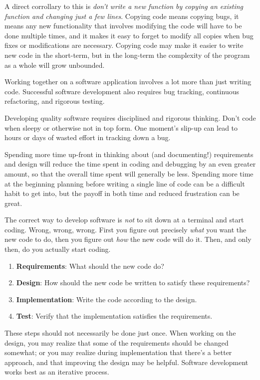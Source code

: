 \documentclass{book}
\begin{document}
A direct corrollary to this is \textit{don't write a new function by
copying an existing function and changing just a few lines}.  Copying
code means copying bugs, it means any new functionality that involves
modifying the code will have to be done multiple times, and it makes
it easy to forget to modify all copies when bug fixes or modifications
are necessary.  Copying code may make it easier to write new code in
the short-term, but in the long-term the complexity of the program as
a whole will grow unbounded.

Working together on a software application involves a lot more than
just writing code.  Successful software development also requires bug
tracking, continuous refactoring, and rigorous testing.

Developing quality software requires disciplined and rigorous
thinking.  Don't code when sleepy or otherwise not in top form.  One
moment's slip-up can lead to hours or days of wasted effort in
tracking down a bug.  

Spending more time up-front in thinking about (and documenting!) 
requirements and design will reduce the time spent in coding and
debugging by an even greater amount, so that the overall time spent
will generally be less.  Spending more time at the beginning planning
before writing a single line of code can be a difficult habit to get
into, but the payoff in both time and reduced frustration can be
great.

The correct way to develop software is \textit{not} to sit down at a
terminal and start coding.  Wrong, wrong, wrong.  First you figure out
precisely \textit{what} you want the new code to do, then you figure
out \textit{how} the new code will do it.  Then, and only then, do you
actually start coding.

\begin{enumerate}
\item \textbf{Requirements}: What should the new code do?
\item \textbf{Design}: How should the new code be written to satisfy these requirements?
\item \textbf{Implementation}: Write the code according to the design.
\item \textbf{Test}: Verify that the implementation satisfies the requirements.
\end{enumerate}

These steps should not necessarily be done just once.  When working on
the design, you may realize that some of the requirements should be
changed somewhat; or you may realize during implementation that
there's a better approach, and that improving the design may be
helpful.  Software development works best as an iterative process.
\end{document}
